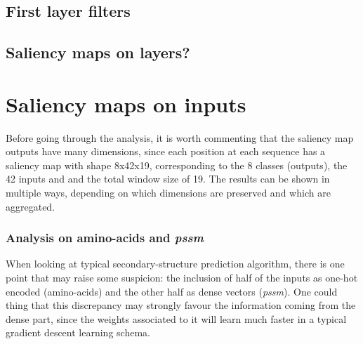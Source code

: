 	\subsection{First layer filters}
	
	\subsection*{Saliency maps on layers?}


\section{Saliency maps on inputs}

Before going through the analysis, it is worth commenting that the saliency map outputs have many dimensions, since each position at each sequence has a saliency map with shape 8x42x19, corresponding to the 8 classes (outputs), the 42 inputs and and the total window size of 19. The results can be shown in multiple ways, depending on which dimensions are preserved and which are aggregated. 


\subsubsection*{Analysis on amino-acids and \textit{pssm}}
When looking at typical secondary-structure prediction algorithm, there is one point that may raise some suspicion: the inclusion of half of the inputs as one-hot encoded (amino-acids) and the other half as dense vectors (\textit{pssm}). One could thing that this discrepancy may strongly favour the information coming from the dense part, since the weights associated to it will learn much faster in a typical gradient descent learning schema.

